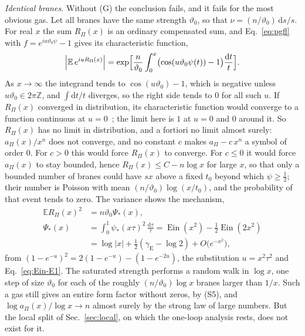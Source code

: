 \documentclass[a4paper,11pt]{article}
\newcommand{\bE}{\mathbb{E}}
\newcommand{\dd}{\mathrm{d}}
\newcommand{\Ein}{\operatorname{Ein}}
\newcommand{\gE}{\gamma_{\mathrm E}}
\begin{document}
\textit{Identical branes.} Without (G) the conclusion fails, and it fails for the most obvious gas. Let all branes have the same strength $\vartheta_0$, so that $\nu=(n/\vartheta_0)\,\dd s/s$. For real $x$ the sum $R_\Pi(x)$ is an ordinary compensated sum, and Eq.~\eqref{eq:pgfl} with $f=e^{iu\vartheta_0\psi}-1$ gives its characteristic function,
\[
\Bigl|\bE\,e^{iuR_\Pi(x)}\Bigr|=\exp\Bigl[\frac n{\vartheta_0}\int_0^x\bigl(\cos(u\vartheta_0\psi(t))-1\bigr)\frac{\dd t}t\Bigr].
\]
As $x\to\infty$ the integrand tends to $\cos(u\vartheta_0)-1$, which is negative unless $u\vartheta_0\in2\pi\mathbb Z$, and $\int\dd t/t$ diverges, so the right side tends to $0$ for all such $u$. If $R_\Pi(x)$ converged in distribution, its characteristic function would converge to a function continuous at $u=0$~\cite{Feller1971}; the limit here is $1$ at $u=0$ and $0$ around it. So $R_\Pi(x)$ has no limit in distribution, and a fortiori no limit almost surely: $a_\Pi(x)/x^n$ does not converge, and no constant $c$ makes $a_\Pi-c\,x^n$ a symbol of order $0$. For $c>0$ this would force $R_\Pi(x)$ to converge. For $c\le0$ it would force $a_\Pi(x)$ to stay bounded, hence $R_\Pi(x)\le C-n\log x$ for large $x$, so that only a bounded number of branes could have $sx$ above a fixed $t_0$ beyond which $\psi\ge\frac12$; their number is Poisson with mean $(n/\vartheta_0)\log(x/t_0)$, and the probability of that event tends to zero. The variance shows the mechanism,
\begin{equation}
\label{eq:Psistar}
\begin{aligned}
\bE R_\Pi(x)^2&=n\vartheta_0\Psi_*(x),\\
\Psi_*(x)&=\int_0^1\psi_*(x\tau)^2\,\frac{\dd\tau}\tau=\Ein(x^2)-\tfrac12\Ein(2x^2)\\
&=\log|x|+\tfrac12(\gE-\log2)+O\bigl(e^{-x^2}\bigr),
\end{aligned}
\end{equation}
from $(1-e^{-u})^2=2(1-e^{-u})-(1-e^{-2u})$, the substitution $u=x^2\tau^2$ and Eq.~\eqref{eq:Ein-E1}. The saturated strength performs a random walk in $\log x$, one step of size $\vartheta_0$ for each of the roughly $(n/\vartheta_0)\log x$ branes larger than $1/x$. Such a gas still gives an entire form factor without zeros, by (S5), and $\log a_\Pi(x)/\log x\to n$ almost surely by the strong law of large numbers. But the local split of Sec.~\ref{sec:local}, on which the one-loop analysis rests, does not exist for it.
\end{document}
